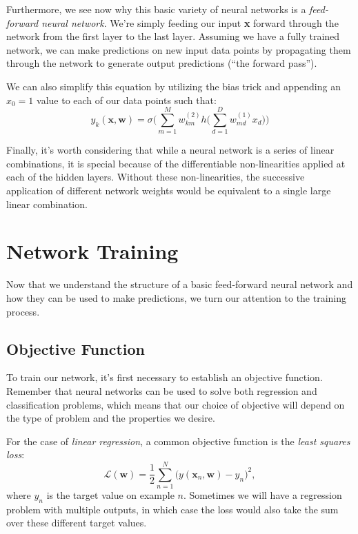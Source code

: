 Furthermore, we see now why this  basic variety of neural networks is a \textit{feed-forward neural network}. We're  simply feeding our input \textbf{x} forward through the network from the first layer to the last layer. Assuming we have a fully trained network, we can make predictions on new input data points by propagating them through the network to generate output predictions (``the forward pass'').

We can also simplify this equation by utilizing the bias trick and appending an $x_{0}=1$ value to each of our data points such that:
\begin{equation*}
	y_{k}(\textbf{x}, \textbf{w}) = \sigma\bigg(\sum_{m=1}^{M}w_{km}^{(2)} h\bigg(\sum_{d=1}^{D}w_{md}^{(1)}x_{d}\bigg)\bigg)
\end{equation*}

Finally, it's worth considering that while a neural network is a series of linear combinations, it is special because of the differentiable non-linearities applied at each of the hidden layers. Without these non-linearities, the successive application of different network weights would be equivalent to a single large linear combination.


\section{Network Training}
Now that we understand the structure of a basic feed-forward neural network and how they can be used to make predictions, we turn our attention to the training process.

\subsection{Objective Function}

To train our network, it's first necessary to establish an objective function. Remember that neural networks can be used to solve both regression and classification problems, which means that our choice of objective will depend on the type of problem and the properties we desire.

For the case of {\em linear regression}, a common objective function is the {\em least squares loss}:
%
\begin{equation} \label{least-squares-loss-function}
	\mathcal{L}(\textbf{w}) = \frac{1}{2} \sum_{n=1}^{N} \bigg(y(\textbf{x}_{n}, \textbf{w}) - y_n\bigg)^{2},
      \end{equation}
      where $y_n$ is the target value on example $n$. Sometimes we will have a regression problem with multiple outputs, in which case the loss would also take the sum over these different target values.
      
